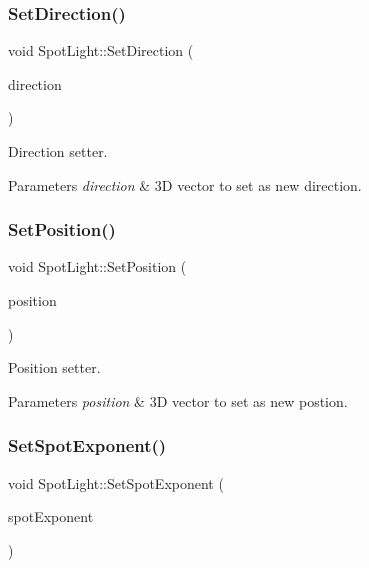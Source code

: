 \subsubsection{\texorpdfstring{Set\+Direction()}{SetDirection()}}
{\footnotesize\ttfamily void Spot\+Light\+::\+Set\+Direction (\begin{DoxyParamCaption}\item[{glm\+::vec3}]{direction }\end{DoxyParamCaption})}



Direction setter. 


\begin{DoxyParams}{Parameters}
{\em direction} & 3D vector to set as new direction. \\
\hline
\end{DoxyParams}
\mbox{\label{class_spot_light_a66a62acf516440ac717b4aa464c3c94a}} 
\subsubsection{\texorpdfstring{Set\+Position()}{SetPosition()}}
{\footnotesize\ttfamily void Spot\+Light\+::\+Set\+Position (\begin{DoxyParamCaption}\item[{glm\+::vec3}]{position }\end{DoxyParamCaption})}



Position setter. 


\begin{DoxyParams}{Parameters}
{\em position} & 3D vector to set as new postion. \\
\hline
\end{DoxyParams}
\mbox{\label{class_spot_light_aa45ba8d849a2a9a994f144c2610fa498}} 
\subsubsection{\texorpdfstring{Set\+Spot\+Exponent()}{SetSpotExponent()}}
{\footnotesize\ttfamily void Spot\+Light\+::\+Set\+Spot\+Exponent (\begin{DoxyParamCaption}\item[{G\+Lfloat}]{spot\+Exponent }\end{DoxyParamCaption})}



